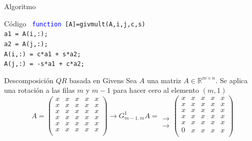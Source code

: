 \documentclass{beamer}
\begin{document}
  \begin{frame}{Algoritmo}
  \begin{block}{C\'odigo}
  \texttt{
  \hspace{-0.25cm}\textcolor{blue}{function} [A]=givmult(A,i,j,c,s)\\
   a1 = A(i,:);\\
   a2 = A(j,:);\\
   A(i,:) = c*a1 + s*a2;\\
   A(j,:) = -s*a1 + c*a2;}
  \end{block}
  \end{frame}
  \begin{frame}{Descomposici\'on $QR$ basada en Givens}
   Sea $A$ una matriz $A \in \mathbb{R}^{m \times n}$. Se aplica una rotaci\'on a las filas $m$ y $m-1$ para hacer cero 
  al elemento $(m,1)$
  $$
  A=\left(\begin{array}{ccccc}
           x & x & x & x & x\\
           x & x & x & x & x\\
           x & x & x & x & x\\
           x & x & x & x & x\\
           x & x & x & x & x\\
           x & x & x & x & x\\
          \end{array}\right) \to G^1_{m-1,m}A = \begin{array}{r}
                                               \\
                                               \\
                                               \\
                                               \\
                                               \to\\
                                               \to
                                              \end{array}\left(\begin{array}{ccccc}
           x & x & x & x & x\\
           x & x & x & x & x\\
           x & x & x & x & x\\
           x & x & x & x & x\\
           x & x & x & x & x\\
           0 & x & x & x & x\\
          \end{array}\right)
  $$
  \end{frame}
\end{document}
